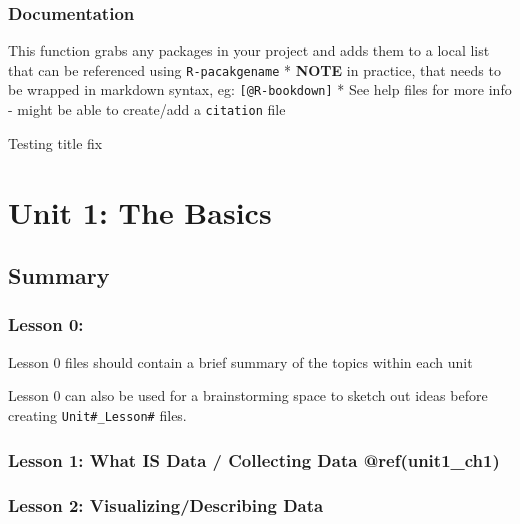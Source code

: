 \documentclass[
]{book}
\begin{document}
\hypertarget{documentation}{%
\subsection*{Documentation}\label{documentation}}

This function grabs any packages in your project and adds them to a local list that can be referenced using \texttt{R-pacakgename}
* \textbf{NOTE} in practice, that needs to be wrapped in markdown syntax, eg:
\texttt{{[}@R-bookdown{]}}
* See help files for more info - might be able to create/add a \texttt{citation} file

Testing title fix

\hypertarget{unit-1-the-basics}{%
\chapter*{Unit 1: The Basics}\label{unit-1-the-basics}}

\hypertarget{summary}{%
\section*{Summary}\label{summary}}

\hypertarget{lesson-0}{%
\subsection{Lesson 0:}\label{lesson-0}}

Lesson 0 files should contain a brief summary of the topics within each unit

Lesson 0 can also be used for a brainstorming space to sketch out ideas before creating \texttt{Unit\#\_Lesson\#} files.

\hypertarget{lesson-1-what-is-data-collecting-data-refunit1_ch1}{%
\subsection*{Lesson 1: What IS Data / Collecting Data @ref(unit1\_ch1)}\label{lesson-1-what-is-data-collecting-data-refunit1_ch1}}

\hypertarget{lesson-2-visualizingdescribing-data}{%
\subsection*{Lesson 2: Visualizing/Describing Data}\label{lesson-2-visualizingdescribing-data}}
\end{document}
